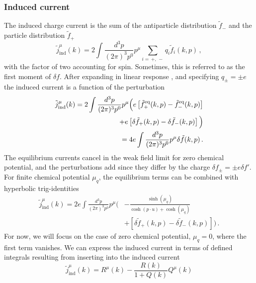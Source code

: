 \subsubsection{Induced current}

The induced charge current is the sum of the antiparticle distribution $\widetilde{f}_-$ and the particle distribution $\widetilde{f}_+$
\begin{equation}\label{eq:perturbation1}
\tilde{j}_{\mathrm{ind}}^\mu(k) = 2\int \frac{d^3 p}{(2 \pi)^3 p^0}p^\mu 
\sum_{i = \, +, \, -} q_i \tilde{f}_{i}(k,p)\,,
\end{equation}
with the factor of two accounting for spin. Sometimes, this is referred to as the first moment of $\delta f$.
After expanding in linear response , and specifying $q_\pm = \pm e$ the induced current is a function of the perturbation
\begin{align}\label{eq:perturbation2}
\tilde{j}_{\mathrm{ind}}^\mu(k) = 2\int \frac{d^3 p}{(2 \pi)^3 p^0}p^\mu \Big( e \left[\tilde{f}^{\mathrm{eq}}_+(k,p)-\tilde{f}^{\mathrm{eq}}_-(k,p)\right]\notag\\
+ e\left[\delta\tilde{f}_+(k,p)-\delta\tilde{f}_-(k,p)\right]
\Big)
\notag\\
=4 e\int \frac{d^3 p}{(2 \pi)^3 p^0}p^\mu \delta\tilde{f}(k,p)
\,.
\end{align}
The equilibrium currents cancel in the weak field limit for zero chemical potential, and the perturbations add since they differ by the charge $\delta f_\pm=\pm e \delta f' $. For finite chemical potential $\mu_q$, the equilibrium terms can be combined with hyperbolic trig-identities
\begin{equation}
\begin{split}
\tilde{j}_{\mathrm{ind}}^\mu(k) 
=2 e\int \frac{d^3 p}{(2 \pi)^3 p^0}p^\mu \Big(&-\frac{\sinh{(\mu_q)}}{\cosh{(p \cdot u)}+\cosh{(\mu_q)}} \\&+  \left[\delta\tilde{f}_+(k,p)-\delta\tilde{f}_-(k,p)\right]
 \Big)
\,.
\end{split}
\end{equation}
For now, we will focus on the case of zero chemical potential, $\mu_q=0$, where the first term vanishes.
We can express the induced current in terms of defined integrals \cite{Formanek:2021blc} resulting from inserting  into the induced current
\begin{equation}\label{eq:jmu}
\widetilde{j}_{\mathrm{ind}}^\mu(k) = R^\mu(k) - \frac{R(k)}{1+Q(k)} Q^\mu(k)
\end{equation}
